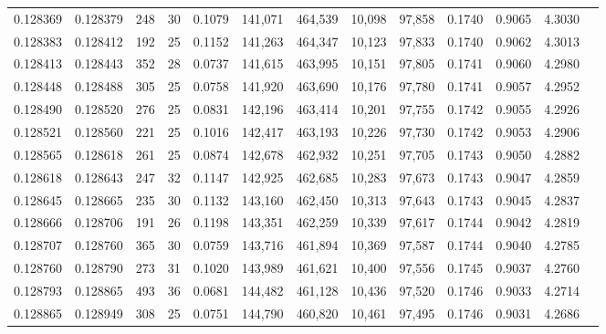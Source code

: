 \begin{tabular}{rrrrrrrrrrrrr}
0.128369 & 0.128379 &   248 &  30 &                                     0.1079 & 141,071 & 464,539 &  10,098 &  97,858 & 0.1740 & 0.9065 & 4.3030 \\
0.128383 & 0.128412 &   192 &  25 &                                     0.1152 & 141,263 & 464,347 &  10,123 &  97,833 & 0.1740 & 0.9062 & 4.3013 \\
0.128413 & 0.128443 &   352 &  28 &                                     0.0737 & 141,615 & 463,995 &  10,151 &  97,805 & 0.1741 & 0.9060 & 4.2980 \\
0.128448 & 0.128488 &   305 &  25 &                                     0.0758 & 141,920 & 463,690 &  10,176 &  97,780 & 0.1741 & 0.9057 & 4.2952 \\
0.128490 & 0.128520 &   276 &  25 &                                     0.0831 & 142,196 & 463,414 &  10,201 &  97,755 & 0.1742 & 0.9055 & 4.2926 \\
0.128521 & 0.128560 &   221 &  25 &                                     0.1016 & 142,417 & 463,193 &  10,226 &  97,730 & 0.1742 & 0.9053 & 4.2906 \\
0.128565 & 0.128618 &   261 &  25 &                                     0.0874 & 142,678 & 462,932 &  10,251 &  97,705 & 0.1743 & 0.9050 & 4.2882 \\
0.128618 & 0.128643 &   247 &  32 &                                     0.1147 & 142,925 & 462,685 &  10,283 &  97,673 & 0.1743 & 0.9047 & 4.2859 \\
0.128645 & 0.128665 &   235 &  30 &                                     0.1132 & 143,160 & 462,450 &  10,313 &  97,643 & 0.1743 & 0.9045 & 4.2837 \\
0.128666 & 0.128706 &   191 &  26 &                                     0.1198 & 143,351 & 462,259 &  10,339 &  97,617 & 0.1744 & 0.9042 & 4.2819 \\
0.128707 & 0.128760 &   365 &  30 &                                     0.0759 & 143,716 & 461,894 &  10,369 &  97,587 & 0.1744 & 0.9040 & 4.2785 \\
0.128760 & 0.128790 &   273 &  31 &                                     0.1020 & 143,989 & 461,621 &  10,400 &  97,556 & 0.1745 & 0.9037 & 4.2760 \\
0.128793 & 0.128865 &   493 &  36 &                                     0.0681 & 144,482 & 461,128 &  10,436 &  97,520 & 0.1746 & 0.9033 & 4.2714 \\
0.128865 & 0.128949 &   308 &  25 &                                     0.0751 & 144,790 & 460,820 &  10,461 &  97,495 & 0.1746 & 0.9031 & 4.2686 \\

\end{tabular}
